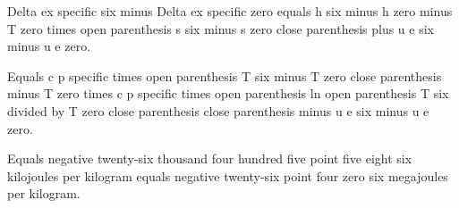 Delta ex specific six minus Delta ex specific zero equals h six minus h zero minus T zero times open parenthesis s six minus s zero close parenthesis plus u e six minus u e zero.  

Equals c p specific times open parenthesis T six minus T zero close parenthesis minus T zero times c p specific times open parenthesis ln open parenthesis T six divided by T zero close parenthesis close parenthesis minus u e six minus u e zero.  

Equals negative twenty-six thousand four hundred five point five eight six kilojoules per kilogram equals negative twenty-six point four zero six megajoules per kilogram.